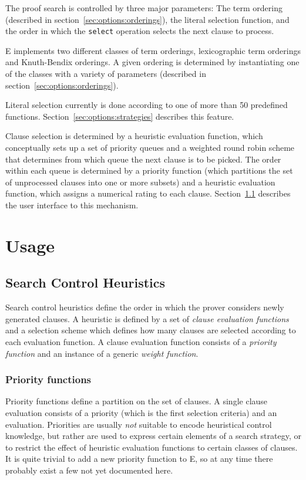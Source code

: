 \documentclass{article}
\begin{document}
The proof search is controlled by three major parameters: The term
ordering (described in section~\ref{sec:options:orderings}), the
literal selection function, and the order in which the \texttt{select}
operation selects the next clause to process. 

E implements two different classes of term orderings, lexicographic
term orderings and Knuth-Bendix orderings. A given ordering is
determined by instantiating one of the classes with a variety of
parameters (described in section~\ref{sec:options:orderings}).

Literal selection currently is done according to one of more than 50
predefined functions. Section~\ref{sec:options:strategies} describes
this feature.

Clause selection is determined by a heuristic evaluation function,
which conceptually sets up a set of priority queues and a weighted
round robin scheme that determines from which queue the next clause is
to be picked. The order within each queue is determined by a priority
function (which partitions the set of unprocessed clauses into one or
more subsets) and a heuristic evaluation function, which assigns a
numerical rating to each clause.  Section~\ref{sec:options:heuristics}
describes the user interface to this mechanism.



\section{Usage}
\label{sec:options}


\subsection{Search Control Heuristics}
\label{sec:options:heuristics}

Search control heuristics define the order in which the prover
considers newly generated clauses. A heuristic is defined by a set of
\emph{clause evaluation functions} and a selection scheme which defines
how many clauses are selected according to each evaluation function. A
clause evaluation function consists of a \emph{priority function} and
an instance of a generic \emph{weight function}.

\subsubsection{Priority functions}

Priority functions define a partition on the set of clauses.  A single
clause evaluation consists of a priority (which is the first selection
criteria) and an evaluation. Priorities are usually \emph{not} suitable
to encode heuristical control knowledge, but rather are used to
express certain elements of a search strategy, or to restrict the
effect of heuristic evaluation functions to certain classes of
clauses. It is quite trivial to add a new priority function to E, so
at any time there probably exist a few not yet documented here.
\end{document}
